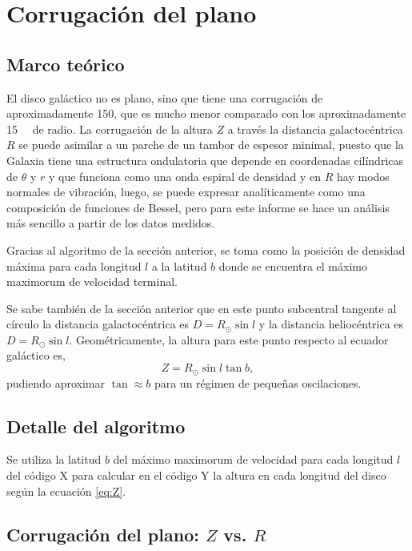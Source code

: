 \section{Corrugación del plano}

\subsection{Marco teórico}

El disco galáctico no es plano, sino que tiene una corrugación de aproximadamente \SI{150}{\parsec}, que es mucho menor comparado con los aproximadamente \SI{15}{\kilo\parsec} de radio. La corrugación de la altura $Z$ a través la distancia galactocéntrica $R$ se puede asimilar a un parche de un tambor de espesor minimal, puesto que la Galaxia tiene una estructura ondulatoria que depende en coordenadas cilíndricas de $\theta$ y $r$ y que funciona como una onda espiral de densidad y en $R$ hay modos normales de vibración, luego, se puede expresar analíticamente como una composición de funciones de Bessel, pero para este informe se hace un análisis más sencillo a partir de los datos medidos.

Gracias al algoritmo de la sección anterior, se toma como la posición de densidad máxima para cada longitud $l$ a la latitud $b$ donde se encuentra el máximo maximorum de velocidad terminal.

Se sabe también de la sección anterior que en este punto subcentral tangente al círculo la distancia galactocéntrica es $D=R_\odot\sin l$ y la distancia heliocéntrica es $D=R_\odot\sin l$. Geométricamente, la altura para este punto respecto al ecuador galáctico es,
\begin{equation}
Z=R_\odot\sin l\tan b
,\label{eq:Z}\end{equation}
pudiendo aproximar $\tan\approx b$ para un régimen de pequeñas oscilaciones.

\subsection{Detalle del algoritmo}

Se utiliza la latitud $b$ del máximo maximorum de velocidad para cada longitud $l$ del código X para calcular en el código Y la altura en cada longitud del disco según la ecuación \ref{eq:Z}. 

\subsection{Corrugación del plano: $Z$ vs. $R$}

